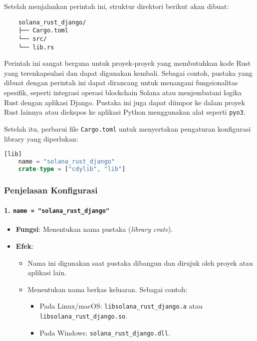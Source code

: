 Setelah menjalankan perintah ini, struktur direktori berikut akan dibuat:
\begin{verbatim}
	solana_rust_django/
	├── Cargo.toml
	└── src/
	└── lib.rs
\end{verbatim}

Perintah ini sangat berguna untuk proyek-proyek yang membutuhkan kode Rust yang terenkapsulasi dan dapat digunakan kembali. Sebagai contoh, pustaka yang dibuat dengan perintah ini dapat dirancang untuk menangani fungsionalitas spesifik, seperti integrasi operasi blockchain Solana atau menjembatani logika Rust dengan aplikasi Django. Pustaka ini juga dapat diimpor ke dalam proyek Rust lainnya atau diekspos ke aplikasi Python menggunakan alat seperti \texttt{pyo3}.

Setelah itu, perbarui file \texttt{Cargo.toml} untuk menyertakan pengaturan konfigurasi library yang diperlukan:

\begin{lstlisting}[language=Rust]
	[lib]
	name = "solana_rust_django"
	crate-type = ["cdylib", "lib"]
\end{lstlisting}

\subsubsection*{Penjelasan Konfigurasi}

\paragraph{1. \texttt{name = "solana\_rust\_django"}} 
\begin{itemize}
	\item \textbf{Fungsi}: Menentukan nama pustaka (\textit{library crate}).
	\item \textbf{Efek}:
	\begin{itemize}
		\item Nama ini digunakan saat pustaka dibangun dan dirujuk oleh proyek atau aplikasi lain.
		\item Menentukan nama berkas keluaran. Sebagai contoh:
		\begin{itemize}
			\item Pada Linux/macOS: \texttt{libsolana\_rust\_django.a} atau \texttt{libsolana\_rust\_django.so}.
			\item Pada Windows: \texttt{solana\_rust\_django.dll}.
		\end{itemize}
	\end{itemize}
\end{itemize}

